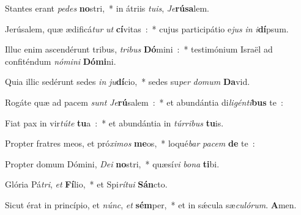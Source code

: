 ﻿\item Stantes erant \emph{pe}\-\emph{des} \textbf{no}\-stri,~* in átriis \emph{tu}\-\emph{is}, \emph{Je}\textbf{rú}\textbf{sa}lem.
\item Jerúsalem, quæ ædificá\emph{tur} \emph{ut} \textbf{cí}\-vitas~:~* cujus participátio e\emph{jus} \emph{in} \emph{i}\textbf{dí}psum.
\item Illuc enim ascendérunt tribus, \emph{tri}\-\emph{bus} \textbf{Dó}\-mini~:~* testimónium Israël ad confiténdum \emph{nó}\-\emph{mi}\-\emph{ni} \textbf{Dó}\textbf{mi}ni.
\item Quia illic sedérunt sedes \emph{in} \emph{ju}\-\textbf{dí}\-cio,~* sedes su\emph{per} \emph{do}\-\emph{mum} \textbf{Da}vid.
\item Rogáte quæ ad pacem \emph{sunt} \emph{Je}\-\textbf{rú}\-salem~:~* et abundántia di\emph{li}\-\emph{gén}\-\emph{ti}\-\textbf{bus} te~:
\item Fiat pax in vir\emph{tú}\-\emph{te} \textbf{tu}a~:~* et abundántia in \emph{túr}\-\emph{ri}\-\emph{bus} \textbf{tu}is.
\item Propter fratres meos, et pró\emph{xi}\-\emph{mos} \textbf{me}\-os,~* loqué\emph{bar} \emph{pa}\-\emph{cem} \textbf{de}  te~:
\item Propter domum Dómini, \emph{De}\-\emph{i} \textbf{no}\-stri,~* quæsí\emph{vi} \emph{bo}\-\emph{na} \textbf{ti}bi.
\item Glória Pá\emph{tri}, \emph{et} \textbf{Fí}\-lio,~* et Spi\emph{rí}\-\emph{tu}\-\emph{i} \textbf{Sán}cto.
\item Sicut érat in princípio, et \emph{núnc}, \emph{et} \textbf{sém}\-per,~* et in sǽcula sæ\emph{cu}\-\emph{ló}\-\emph{rum}. \textbf{A}men.
